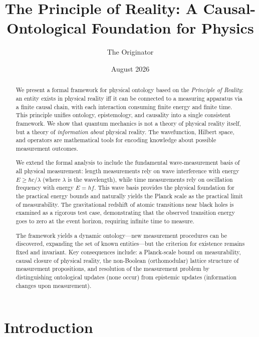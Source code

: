 \documentclass[aps,preprint,showpacs,showkeys]{revtex4}%
\begin{document}
\title{The Principle of Reality: A Causal-Ontological Foundation for Physics}
\author{The Originator}
\date{August 2026}

\begin{abstract}
We present a formal framework for physical ontology based on the \textit{%
Principle of Reality}: an entity exists in physical reality iff it can be
connected to a measuring apparatus via a finite causal chain, with each
interaction consuming finite energy and finite time. This principle unifies
ontology, epistemology, and causality into a single consistent framework. We
show that quantum mechanics is not a theory of physical reality itself, but
a theory of \textit{information about} physical reality. The wavefunction,
Hilbert space, and operators are mathematical tools for encoding knowledge
about possible measurement outcomes.

We extend the formal analysis to include the fundamental wave-measurement
basis of all physical measurement: length measurements rely on wave
interference with energy $E \ge \hbar c/\lambda$ (where $\lambda$ is the
wavelength), while time measurements rely on oscillation frequency with
energy $E = hf$. This wave basis provides the physical foundation for the
practical energy bounds and naturally yields the Planck scale as the
practical limit of measurability. The gravitational redshift of atomic
transitions near black holes is examined as a rigorous test case,
demonstrating that the observed transition energy goes to zero at the event
horizon, requiring infinite time to measure.

The framework yields a dynamic ontology---new measurement procedures can be
discovered, expanding the set of known entities---but the criterion for
existence remains fixed and invariant. Key consequences include: a
Planck-scale bound on measurability, causal closure of physical reality, the
non-Boolean (orthomodular) lattice structure of measurement propositions,
and resolution of the measurement problem by distinguishing ontological
updates (none occur) from epistemic updates (information changes upon
measurement).
\end{abstract}

\maketitle


\section{Introduction}
\end{document}
